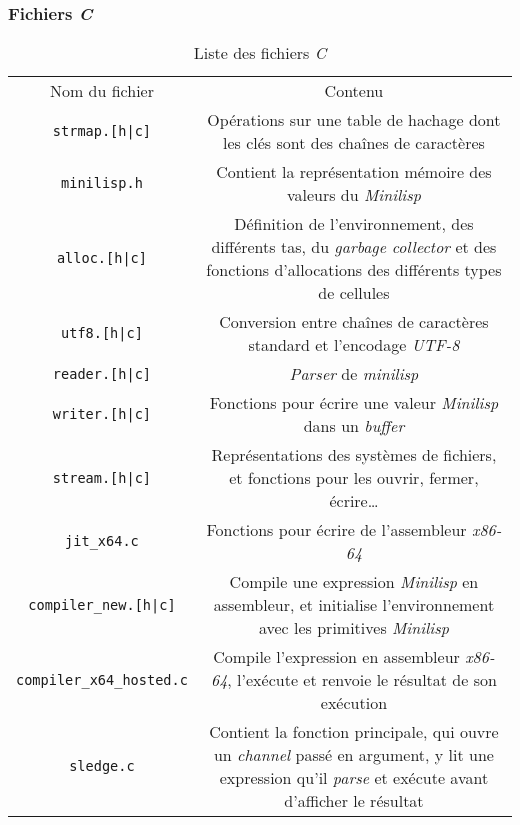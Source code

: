 \documentclass[c, 11pt, handout, xcolor=table]{beamer}
\newcommand{\code}[1]{\texttt{#1}}
\newcommand{\foreign}[1]{\emph{#1}}
\begin{document}
\begin{frame}
 \frametitle{Fichiers \foreign{C}}
 
 \begin{table}[H]
  \centering
  \begin{tabularx}{\linewidth}{|C|C|}
    \hline
    Nom du fichier & Contenu \tabularnewline
    \hhline{|=|=|}
    \code{strmap.[h|c]} & Opérations sur une table de hachage dont les clés sont des chaînes de caractères \tabularnewline
    \hhline{|=|=|}
    \code{minilisp.h} & Contient la représentation mémoire des valeurs du \foreign{Minilisp} \tabularnewline
    \hhline{|=|=|}
    \code{alloc.[h|c]} & Définition de l'environnement, des différents tas, du \foreign{garbage collector} et des fonctions d'allocations des différents types de cellules \tabularnewline
    \hhline{|=|=|}
    \code{utf8.[h|c]} & Conversion entre chaînes de caractères standard et l'encodage \foreign{UTF-8} \tabularnewline
    \hline
    \code{reader.[h|c]} & \foreign{Parser} de \foreign{minilisp} \tabularnewline
    \hline
    \code{writer.[h|c]} & Fonctions pour écrire une valeur \foreign{Minilisp} dans un \foreign{buffer} \tabularnewline
    \hline
    \code{stream.[h|c]} & Représentations des systèmes de fichiers, et fonctions pour les ouvrir, fermer, écrire\ldots \tabularnewline
    \hhline{|=|=|}
    \code{jit\_x64.c} & Fonctions pour écrire de l'assembleur \foreign{x86-64} \tabularnewline
    \hline
    \code{compiler\_new.[h|c]} & Compile une expression \foreign{Minilisp} en assembleur, et initialise l'environnement avec les primitives \foreign{Minilisp} \tabularnewline
    \hline
    \code{compiler\_x64\_hosted.c} & Compile l'expression en assembleur \foreign{x86-64}, l'exécute et renvoie le résultat de son exécution \tabularnewline
    \hhline{|=|=|}
    \code{sledge.c} & Contient la fonction principale, qui ouvre un \foreign{channel} passé en argument, y lit une expression qu'il \foreign{parse} et exécute avant d'afficher le résultat \tabularnewline
    \hline
  \end{tabularx}
  \caption{Liste des fichiers \foreign{C}}
 \end{table}
\end{frame}
\end{document}
